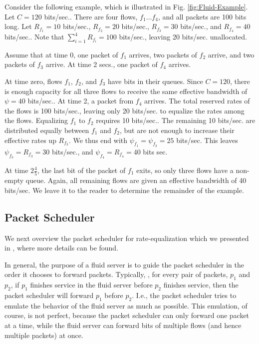 \documentclass[conference]{IEEEtran}
\begin{document}




Consider the following example, which is illustrated in Fig.
\ref{fig:Fluid-Example}. Let $C = 120$ bits/sec.. There are four flows, $f_1 
\ldots f_4$, and all packets are 100 bits long. Let $R_{f_1} = 10$ bits/sec., 
$R_{f_2} = 20$ bits/sec., $R_{f_3} = 30$ bits/sec., and $R_{f_4} = 40$ 
bits/sec.. Note that $\sum_{i=1}^{4} R_{f_i} = 100$ bits/sec., leaving 20 
bits/sec.  unallocated.

Assume that at time 0, one packet of $f_1$ arrives, two packets of $f_2$ 
arrive, and two packets of $f_3$ arrive. At time 2 secs., one packet of $f_4$ 
arrives.

At time zero, flows $f_1$, $f_2$, and $f_3$ have bits in their queues. Since $C 
= 120$, there is enough capacity for all  three flows to receive the same 
effective bandwidth of $\psi = 40$ bits/sec.. At time 2, a packet from $f_4$ 
arrives.  The total reserved rates of the flows is 100 bits/sec., leaving only 
20 bits/sec. to equalize the rates among the flows. Equalizing $f_1$ to $f_2$ 
requires 10 bits/sec.. The remaining 10 bits/sec. are distributed equally 
between $f_1$ and $f_2$, but are not enough to increase their effective rates 
up $R_{f_3}$. We thus end with $\psi_{f_1} = \psi_{f_2} = 25$ bits/sec. This 
leaves $\psi_{f_3} = R_{f_3} = 30$ bits/sec., and $\psi_{f_4} = R_{f_4} = 40$ 
bits sec.

At time $2\frac{4}{5}$, the last bit of the packet of $f_1$ exits, so only 
three flows have a non-empty queue. Again, all remaining flows are given an 
effective bandwidth of 40 bits/sec.  We leave it to the reader to determine the 
remainder of the example.


\subsection{Packet Scheduler}



We next overview the packet scheduler for rate-equalization which we presented 
in \cite{Cobb-REQ}, where more details can be found. 

In general, the purpose of a fluid server is to guide the packet scheduler in 
the order it chooses to forward packets. Typically, 
\cite{Cobb-Universal-Timestamp-CN}\cite{GPS-Parekh}\cite{RP-Fair-Servers-ToN}, 
for every pair of packets, $p_1$ and $p_2$, if $p_1$ finishes service in the 
fluid server before $p_2$ finishes service, then the packet scheduler will 
forward $p_1$ before $p_2$. I.e., the packet scheduler tries to emulate the 
behavior of the fluid server as much as possible. This emulation, of course, is 
not perfect, because the packet scheduler can only forward one packet at a 
time, while the fluid server can forward bits of multiple flows (and hence 
multiple packets) at once.
\end{document}
